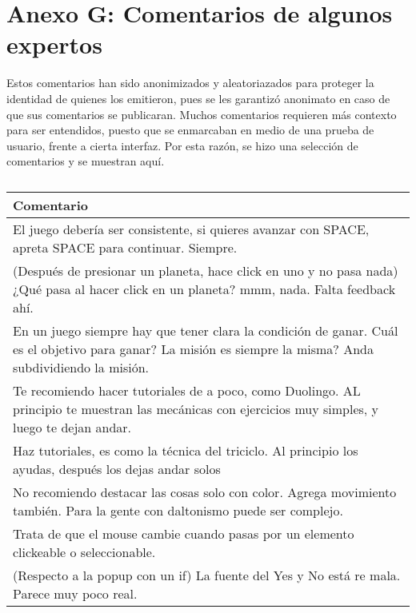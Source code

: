 \chapter*{Anexo G: Comentarios de algunos expertos}\label{AnexoG}

Estos comentarios han sido anonimizados y aleatoriazados para proteger la identidad de quienes los emitieron, pues se les garantizó anonimato en caso de que sus comentarios se publicaran.
Muchos comentarios requieren más contexto para ser entendidos, puesto que se enmarcaban en medio de una prueba de usuario, frente a cierta interfaz. Por esta razón, se hizo una selección de comentarios y se muestran aquí.



\begin{table}[h]
   \centering
   \caption*{\textit{ }}
   \begin{tabular}{|p{\linewidth}|}
   \hline
   \textbf{Comentario} \\\hline
   El juego debería ser consistente, si quieres avanzar con SPACE, apreta SPACE para continuar. Siempre. \\\hline
   (Después de presionar un planeta, hace click en uno y no pasa nada) ¿Qué pasa al hacer click en un planeta? mmm, nada. Falta feedback ahí. \\\hline
   
   En un juego siempre hay que tener clara la condición de ganar.
   Cuál es el objetivo para ganar? La misión es siempre la misma? Anda subdividiendo la misión. \\\hline

   Te recomiendo hacer tutoriales de a poco, como Duolingo. AL principio te muestran las mecánicas con ejercicios muy simples, y luego te dejan andar. \\\hline

   Haz tutoriales, es como la técnica del triciclo. Al principio los ayudas, después los dejas andar solos \\\hline

   No recomiendo destacar las cosas solo con color. Agrega movimiento también. Para la gente con daltonismo puede ser complejo. \\\hline

   Trata de que el mouse cambie cuando pasas por un elemento clickeable o seleccionable. \\\hline

   (Respecto a la popup con un if) La fuente del Yes y No está re mala. Parece muy poco real. \\\hline


\end{tabular}
\end{table}
